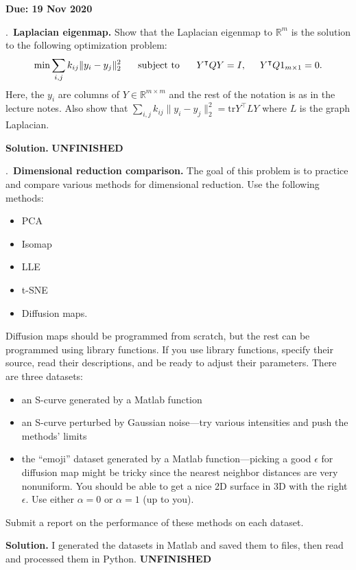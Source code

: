 \documentclass{letter}
\newcounter{problem}
\newcounter{solution}
\newcommand{\Problem}[2]{%
	\stepcounter{problem}%
	\leftskip=0pt%
	\theproblem.~\textbf{{#1.}} #2 \par%
}
\newcommand{\Solution}[1]{%
	\textbf{Solution.} #1 \par%
}
\newcommand{\Due}[1]{\textbf{Due: #1} \par}
\newcommand{\UNFINISHED}{\textbf{\color{red} UNFINISHED}}
\newcommand{\T}{\intercal}
\newcommand{\R}{\mathbb{R}}
\begin{document}
    \Due{19 Nov 2020}

    \Problem{Laplacian eigenmap}{Show that the Laplacian eigenmap to $\R^m$ is the solution to the following optimization problem: \begin{align*}
        \min\sum_{i, j} k_{ij}\|y_i - y_j\|_2^2 \hspace{5mm} \text{ subject to } \hspace{5mm} Y^\T Q Y = I, \hspace{5mm} Y^\T Q 1_{m\times 1} = 0.
    \end{align*} Here, the $y_i$ are columns of $Y \in \R^{m \times m}$ and the rest of the notation is as in the lecture notes. Also show that $\sum_{i, j} k_{ij}\|y_i - y_j\|^2_2 = \text{tr} Y^\T L Y$ where $L$ is the graph Laplacian.}
    \Solution{\UNFINISHED}

    \Problem{Dimensional reduction comparison}{The goal of this problem is to practice and compare various methods for dimensional reduction. Use the following methods: \begin{itemize}
        \item PCA
        \item Isomap
        \item LLE
        \item t-SNE
        \item Diffusion maps.
    \end{itemize} Diffusion maps should be programmed from scratch, but the rest can be programmed using library functions. If you use library functions, specify their source, read their descriptions, and be ready to adjust their parameters. There are three datasets: \begin{itemize}
        \item an S-curve generated by a Matlab function
        \item an S-curve perturbed by Gaussian noise---try various intensities and push the methods' limits
        \item the ``emoji'' dataset generated by a Matlab function---picking a good $\epsilon$ for diffusion map might be tricky since the nearest neighbor distances are very nonuniform. You should be able to get a nice 2D surface in 3D with the right $\epsilon$. Use either $\alpha=0$ or $\alpha=1$ (up to you).
    \end{itemize} Submit a report on the performance of these methods on each dataset.}
    \Solution{I generated the datasets in Matlab and saved them to files, then read and processed them in Python. \UNFINISHED}
\end{document}
